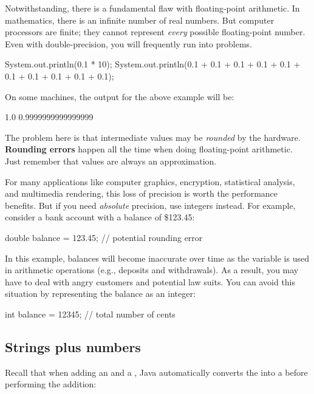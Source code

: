 Notwithstanding, there is a fundamental flaw with floating-point arithmetic.
In mathematics, there is an infinite number of real numbers.
But computer processors are finite; they cannot represent {\em every} possible floating-point number.
Even with double-precision, you will frequently run into problems.

\begin{code}
    System.out.println(0.1 * 10);
    System.out.println(0.1 + 0.1 + 0.1 + 0.1 + 0.1
                     + 0.1 + 0.1 + 0.1 + 0.1 + 0.1);
\end{code}

On some machines, the output for the above example will be:

\begin{stdout}
    1.0
    0.9999999999999999
\end{stdout}

The problem here is that intermediate values may be {\em rounded} by the hardware.
{\bf Rounding errors} happen all the time when doing floating-point arithmetic.
Just remember that  values are always an approximation.

For many applications like computer graphics, encryption, statistical analysis, and multimedia rendering, this loss of precision is worth the performance benefits.
But if you need {\em absolute} precision, use integers instead.
For example, consider a bank account with a balance of \$123.45:

\begin{code}
    double balance = 123.45;  // potential rounding error
\end{code}

In this example, balances will become inaccurate over time as the variable is used in arithmetic operations (e.g., deposits and withdrawals).
As a result, you may have to deal with angry customers and potential law suits.
You can avoid this situation by representing the balance as an integer:

\begin{code}
    int balance = 12345;      // total number of cents
\end{code}

\subsection{Strings plus numbers}

Recall that when adding an  and a , Java automatically converts the  into a  before performing the addition:

